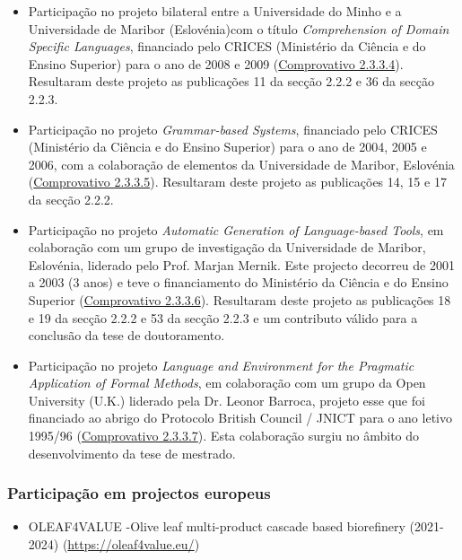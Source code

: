 \documentclass[11pt]{article}
\begin{document}
\begin{itemize}
\item {Participação no projeto bilateral entre a Universidade do Minho e a Universidade de Maribor (Eslovénia)com o título {\em{ Comprehension of Domain Specific Languages}}, financiado pelo CRICES (Ministério da Ciência e do Ensino Superior) para o ano de 2008 e 2009 (\href{run:Projectos/declaracoesUM.pdf}{Comprovativo 2.3.3.4}). Resultaram deste projeto as publicações 11 da secção 2.2.2 e 36 da secção 2.2.3.}
\item {Participação no projeto {\em{ Grammar-based Systems}}, financiado pelo CRICES (Ministério da Ciência e do Ensino Superior) para o ano de 2004, 2005 e 2006, com a colaboração de elementos da Universidade de Maribor, Eslovénia (\href{run:Projectos/GBS.pdf}{Comprovativo 2.3.3.5}). Resultaram deste projeto as publicações 14, 15 e 17 da secção 2.2.2.}
\item {Participação no projeto {\em{ Automatic Generation of Language-based Tools}}, em colaboração com um grupo de investigação da Universidade de Maribor, Eslovénia, liderado pelo Prof. Marjan Mernik. Este projecto decorreu de 2001 a 2003 (3 anos) e teve o financiamento do Ministério da Ciência e do Ensino Superior (\href{run:Projectos/declaracoesUM.pdf}{Comprovativo 2.3.3.6}). Resultaram deste projeto as publicações 18 e 19 da secção 2.2.2 e 53 da secção 2.2.3 e um contributo válido para a conclusão da tese de doutoramento.}
\item {Participação no projeto {\em{ Language and Environment for the Pragmatic Application of Formal Methods}}, em colaboração com um grupo da Open University (U.K.) liderado pela Dr. Leonor Barroca, projeto esse que foi financiado ao abrigo do Protocolo British Council / JNICT para o ano letivo 1995/96 (\href{run:Projectos/declaracoesUM.pdf}{Comprovativo 2.3.3.7}). Esta colaboração surgiu no âmbito do desenvolvimento da tese de mestrado.}
\end{itemize}


\subsubsection{Participação em projectos europeus}
\begin{itemize}
\item {OLEAF4VALUE -Olive leaf multi-product cascade based biorefinery (2021-2024) (\url{https://oleaf4value.eu/})}
\end{itemize}
\end{document}
